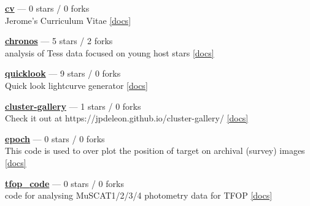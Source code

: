 \item \href{https://github.com/jpdeleon/cv}{{\bf cv}} --- 0 stars / 0 forks \\
Jerome's Curriculum Vitae \href{https://raw.githubusercontent.com/jpdeleon/cv/main-pdf/tex/cv_pubs.pdf}{[docs]}

\item \href{https://github.com/jpdeleon/chronos}{{\bf chronos}} --- 5 stars / 2 forks \\
analysis of Tess data focused on young host stars \href{None}{[docs]}

\item \href{https://github.com/jpdeleon/quicklook}{{\bf quicklook}} --- 9 stars / 0 forks \\
Quick look lightcurve generator \href{None}{[docs]}

\item \href{https://github.com/jpdeleon/cluster-gallery}{{\bf cluster-gallery}} --- 1 stars / 0 forks \\
Check it out at https://jpdeleon.github.io/cluster-gallery/ \href{None}{[docs]}

\item \href{https://github.com/jpdeleon/epoch}{{\bf epoch}} --- 0 stars / 0 forks \\
This code is used to over plot the position of target on archival (survey) images \href{None}{[docs]}

\item \href{https://github.com/jpdeleon/tfop_code}{{\bf tfop{\_}code}} --- 0 stars / 0 forks \\
code for analysing MuSCAT1/2/3/4 photometry data for TFOP \href{None}{[docs]}